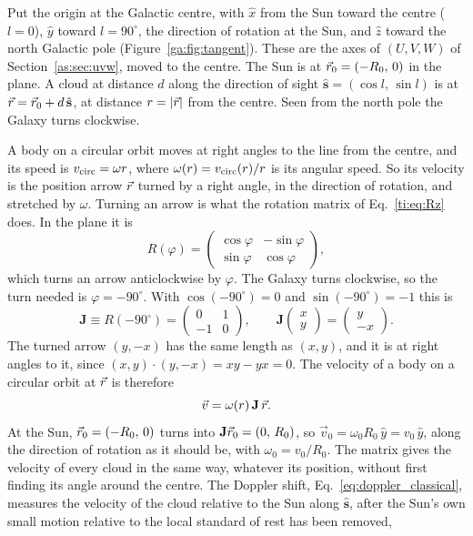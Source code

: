 Put the origin at the Galactic centre, with $\hat x$ from the Sun toward the centre ($l=0$), $\hat y$ toward $l=90^\circ$, the direction of rotation at the Sun, and $\hat z$ toward the north Galactic pole (Figure~\ref{ga:fig:tangent}). These are the axes of $(U,V,W)$ of Section~\ref{as:sec:uvw}, moved to the centre. The Sun is at $\vec r_0=(-R_0,\,0)$ in the plane. A cloud at distance $d$ along the direction of sight $\hat{\mathbf s}=(\cos l,\,\sin l)$ is at $\vec r=\vec r_0+d\,\hat{\mathbf s}$, at distance $r=|\vec r|$ from the centre. Seen from the north pole the Galaxy turns clockwise.

A body on a circular orbit moves at right angles to the line from the centre, and its speed is $v_{\rm circ}=\omega r$, where $\omega(r)=v_{\rm circ}(r)/r$ is its angular speed. So its velocity is the position arrow $\vec r$ turned by a right angle, in the direction of rotation, and stretched by $\omega$. Turning an arrow is what the rotation matrix of Eq.~\eqref{ti:eq:Rz} does. In the plane it is
\[
R(\varphi)=\begin{pmatrix}\cos\varphi&-\sin\varphi\\ \sin\varphi&\cos\varphi\end{pmatrix},
\]
which turns an arrow anticlockwise by $\varphi$. The Galaxy turns clockwise, so the turn needed is $\varphi=-90^\circ$. With $\cos(-90^\circ)=0$ and $\sin(-90^\circ)=-1$ this is
\[
\mathbf J\equiv R(-90^\circ)=\begin{pmatrix}0&1\\-1&0\end{pmatrix},\qquad
\mathbf J\begin{pmatrix}x\\y\end{pmatrix}=\begin{pmatrix}y\\-x\end{pmatrix}.
\]
The turned arrow $(y,-x)$ has the same length as $(x,y)$, and it is at right angles to it, since $(x,y)\cdot(y,-x)=xy-yx=0$. The velocity of a body on a circular orbit at $\vec r$ is therefore
\begin{equation}
	\vec v=\omega(r)\,\mathbf J\,\vec r .
\end{equation}
At the Sun, $\vec r_0=(-R_0,\,0)$ turns into $\mathbf J\vec r_0=(0,\,R_0)$, so $\vec v_0=\omega_0R_0\,\hat y=v_0\,\hat y$, along the direction of rotation as it should be, with $\omega_0=v_0/R_0$. The matrix gives the velocity of every cloud in the same way, whatever its position, without first finding its angle around the centre. The Doppler shift, Eq.~\eqref{eq:doppler_classical}, measures the velocity of the cloud relative to the Sun along $\hat{\mathbf s}$, after the Sun's own small motion relative to the local standard of rest has been removed,
